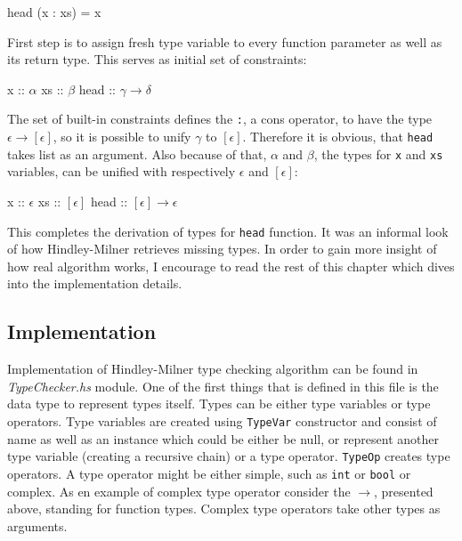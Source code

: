 \documentclass[12pt,a4paper]{report}
\begin{document}
\vspace*{0.2in}
\begin{code}[style=haskell]
  head (x : xs) = x
\end{code}

First step is to assign fresh type variable to every function parameter as
well as its return type. This serves as initial set of constraints:

\vspace*{0.2in}
\begin{code}[mathescape=true,style=haskell]
  x :: $\alpha$
  xs :: $\beta$
  head :: $\gamma \rightarrow \delta$
\end{code}

The set of built-in constraints defines the \texttt{:}, a cons operator, to
have the type $\epsilon \rightarrow [\epsilon]$, so it is possible to unify
$\gamma$ to $[\epsilon]$. Therefore it is obvious, that \texttt{head} takes
list as an argument. Also because of that, $\alpha$ and $\beta$, the types for
\texttt{x} and \texttt{xs} variables, can be unified with respectively
$\epsilon$ and $[\epsilon]$:

\vspace*{0.2in}
\begin{code}[mathescape=true,style=haskell]
  x :: $\epsilon$
  xs :: $[\epsilon]$
  head :: $[\epsilon] \rightarrow \epsilon$
\end{code}

This completes the derivation of types for \texttt{head} function. It was an
informal look of how Hindley-Milner retrieves missing types. In order to gain
more insight of how real algorithm works, I encourage to read the rest of this
chapter which dives into the implementation details.

\subsection{Implementation}
Implementation of Hindley-Milner type checking algorithm can be found in
\textit{TypeChecker.hs} module. One of the first things that is defined in this
file is the data type to represent types itself. Types can be either type
variables or type operators. Type variables are created using \texttt{TypeVar}
constructor and consist of name as well as an instance which could be either be
null, or represent another type variable (creating a recursive chain) or a type
operator. \texttt{TypeOp} creates type operators. A type operator might
be either simple, such as \texttt{int} or \texttt{bool} or complex. As en
example of complex type operator consider the $\rightarrow$, presented
above, standing for function types. Complex type operators take other types as
arguments.
\end{document}
